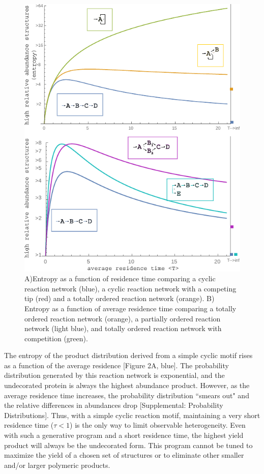 \documentclass[twocolumn]{article}
\begin{document}
\begin{figure}[h]
    \includegraphics[width=\textwidth]{Figure_3.pdf}
	\caption{A)Entropy as a function of residence time comparing a cyclic reaction network (blue), a cyclic reaction network with a competing tip (red) and a totally ordered reaction network (orange). B) Entropy as a function of average residence time comparing a totally ordered reaction network (orange), a partially ordered reaction network (light blue), and totally ordered reaction network with competition (green).}
\end{figure}

The entropy of the product distribution derived from a simple cyclic motif rises as a function of the average residence [Figure 2A, blue]. The probability distribution generated by this reaction network is exponential, and the undecorated protein is always the highest abundance product. However, as the average residence time increases, the probability distribution ``smears out" and the relative differences in abundances drop [Supplemental: Probability Distributions]. Thus, with a simple cyclic reaction motif, maintaining a very short residence time ($\tau <1 $) is the only way to limit observable heterogeneity. Even with such a generative program and a short residence time, the highest yield product will always be the undecorated form. This program cannot be tuned to maximize the yield of a chosen set of structures or to eliminate other smaller and/or larger polymeric products. 
\end{document}
